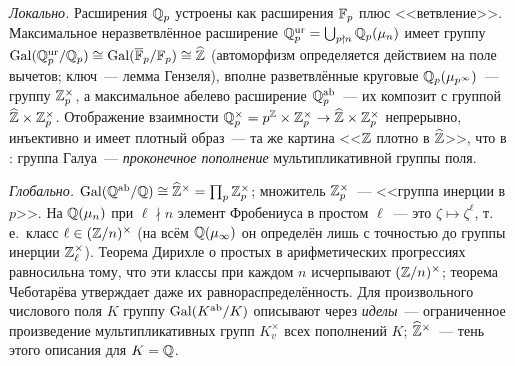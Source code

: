 \begin{aside}
\emph{Локально.} Расширения $\mathbb Q_p$ устроены как расширения $\mathbb F_p$ плюс <<ветвление>>. Максимальное неразветвлённое
расширение $\mathbb Q_p^{\rm ur}=\bigcup_{p\nmid n}\mathbb Q_p(\mu_n)$ имеет группу $\operatorname{Gal}(\mathbb Q_p^{\rm ur}/\mathbb Q_p)\cong\operatorname{Gal}(\overline{\mathbb F}_p/\mathbb F_p)\cong\widehat{\mathbb Z}$ (автоморфизм
определяется действием на поле вычетов; ключ~--- лемма Гензеля), вполне разветвлённые круговые $\mathbb Q_p(\mu_{p^\infty})$~---
группу $\mathbb Z_p^\times$, а максимальное абелево расширение $\mathbb Q_p^{\rm ab}$~--- их композит с группой $\widehat{\mathbb Z}\times\mathbb Z_p^\times$.
Отображение взаимности $\mathbb Q_p^\times=p^{\mathbb Z}\times\mathbb Z_p^\times\to\widehat{\mathbb Z}\times\mathbb Z_p^\times$ непрерывно, инъективно и имеет плотный
образ~--- та же картина <<$\mathbb Z$ плотно в $\widehat{\mathbb Z}$>>, что в : группа Галуа~--- \emph{проконечное пополнение}
мультипликативной группы поля.

\emph{Глобально.} $\operatorname{Gal}(\mathbb Q^{\mathrm{ab}}/\mathbb Q)\cong\widehat{\mathbb Z}^\times=\prod_p\mathbb Z_p^\times$; множитель $\mathbb Z_p^\times$~--- <<группа инерции в $p$>>. На
$\mathbb Q(\mu_n)$ при $\ell\nmid n$ элемент Фробениуса в простом $\ell$~--- это $\zeta\mapsto\zeta^\ell$, т.\,е.\ класс
$\ell\in(\mathbb Z/n)^\times$ (на всём $\mathbb Q(\mu_\infty)$ он определён лишь с точностью до группы инерции $\mathbb Z_\ell^\times$). Теорема
Дирихле о простых в арифметических прогрессиях равносильна тому, что эти классы при каждом $n$ исчерпывают $(\mathbb Z/n)^\times$;
теорема Чеботарёва утверждает даже их равнораспределённость. Для произвольного числового поля $K$ группу
$\operatorname{Gal}(K^{\rm ab}/K)$ описывают через \emph{иделы}~--- ограниченное произведение мультипликативных групп $K_v^\times$ всех
пополнений $K$; $\widehat{\mathbb Z}^\times$~--- тень
этого описания для $K=\mathbb Q$.
\end{aside}

